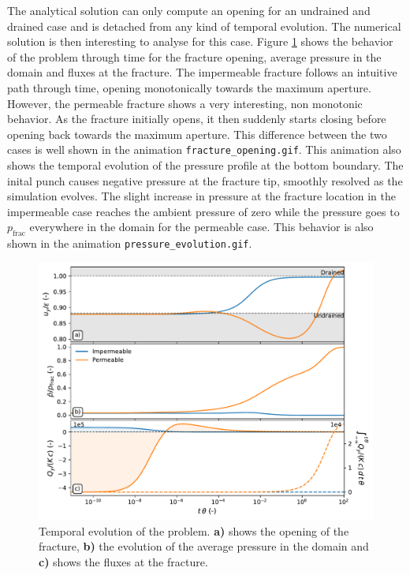 \documentclass{article}
\begin{document}
The analytical solution can only compute an opening for an undrained and drained case and is detached from any kind of temporal evolution. The numerical solution is then interesting to analyse for this case. Figure \ref{fig:time} shows the behavior of the problem through time for the fracture opening, average pressure in the domain and fluxes at the fracture. The impermeable fracture follows an intuitive path through time, opening monotonically towards the maximum aperture. However, the permeable fracture shows a very interesting, non monotonic behavior. As the fracture initially opens, it then suddenly starts closing before opening back towards the maximum aperture. This difference between the two cases is well shown in the animation \texttt{fracture_opening.gif}. This animation also shows the temporal evolution of the pressure profile at the bottom boundary. The inital punch causes negative pressure at the fracture tip, smoothly resolved as the simulation evolves. The slight increase in pressure at the fracture location in the impermeable case reaches the ambient pressure of zero while the pressure goes to $p_{\text{frac}}$ everywhere in the domain for the permeable case. This behavior is also shown in the animation \texttt{pressure_evolution.gif}.

\begin{figure}[h]
    \centering
    \includegraphics[width=1\textwidth]{../figures/time_behavior}
    \caption{Temporal evolution of the problem. \textbf{a)} shows the opening of the fracture, \textbf{b)} the evolution of the average pressure in the domain and \textbf{c)} shows the fluxes at the fracture.}
    \label{fig:time}
\end{figure}
\end{document}
